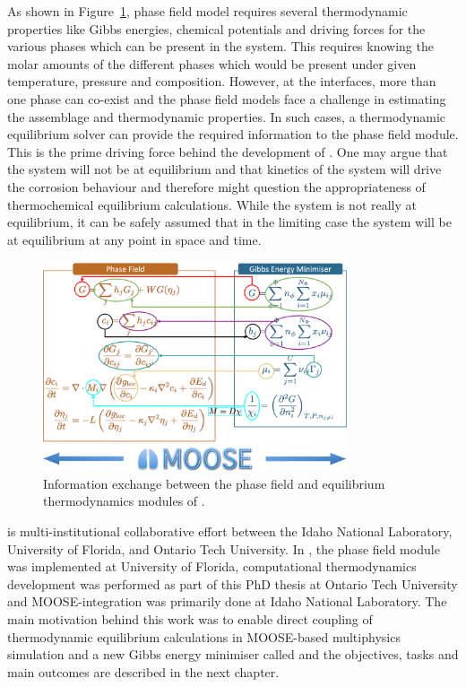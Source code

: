 	As shown in Figure~\ref{fig:yj_io}, {\YJ} phase field model requires several thermodynamic properties like Gibbs energies, chemical potentials and driving forces for the various phases which can be present in the system. This requires knowing the molar amounts of the different phases which would be present under given temperature, pressure and composition. However, at the interfaces, more than one phase can co-exist and the phase field models face a challenge in estimating the assemblage and thermodynamic properties. In such cases, a thermodynamic equilibrium solver can provide the required information to the phase field module. This is the prime driving force behind the development of {\GEM}. One may argue that the system will not be at equilibrium and that kinetics of the system will drive the corrosion behaviour and therefore might question the appropriateness of thermochemical equilibrium calculations. While the system is not really at equilibrium, it can be safely assumed that in the limiting case the system will be at equilibrium at any point in space and time.
	\begin{figure}[htb]
		\centering
		\includegraphics[width=0.8\textwidth]{figures/chapter-1/YJ_PF_IO.png}
		\caption{Information exchange between the phase field and equilibrium thermodynamics modules of \YJ.}
		\label{fig:yj_io}
	\end{figure} 	

	{\YJ} is multi-institutional collaborative effort between the Idaho National Laboratory, University of Florida, and Ontario Tech University.  In {\YJ}, the phase field module was implemented at University of Florida, computational thermodynamics development was performed as part of this PhD thesis at Ontario Tech University and MOOSE-integration was primarily done at Idaho National Laboratory. The main motivation behind this work was to enable direct coupling of thermodynamic equilibrium calculations in MOOSE-based multiphysics simulation and a new Gibbs energy minimiser called {\GEM} and the objectives, tasks and main outcomes are described in the next chapter.
	
